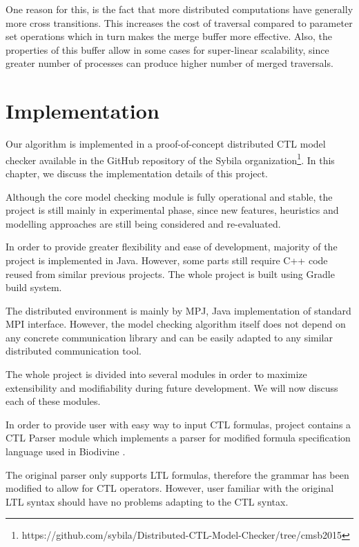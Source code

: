 \documentclass[12pt,oneside]{fithesis2}
\begin{document}
			One reason for this, is the fact that more distributed computations have generally more cross transitions. This increases the cost of traversal compared to parameter set operations which in turn makes the merge buffer more effective. Also, the properties of this buffer allow in some cases for super-linear scalability, since greater number of processes can produce higher number of merged traversals. 			
	
	\chapter{Implementation}

		Our algorithm is implemented in a proof-of-concept distributed CTL model checker available in the GitHub repository of the Sybila organization\footnote{https://github.com/sybila/Distributed-CTL-Model-Checker/tree/cmsb2015}. In this chapter, we discuss the implementation details of this project. 
		
		Although the core model checking module is fully operational and stable, the project is still mainly in experimental phase, since new features, heuristics and modelling approaches are still being considered and re-evaluated.
		
		In order to provide greater flexibility and ease of development, majority of the project is implemented in Java. However, some parts still require C++ code reused from similar previous projects. The whole project is built using Gradle build system.
			
		The distributed environment is mainly by MPJ, Java implementation of standard MPI interface. However, the model checking algorithm itself does not depend on any concrete communication library and can be easily adapted to any similar distributed communication tool.
			
		The whole project is divided into several modules in order to maximize extensibility and modifiability during future de\-vel\-op\-ment. We will now discuss each of these modules.
			
		In order to provide user with easy way to input CTL formulas, project contains a CTL Parser module which implements a parser for modified formula specification language used in Biodivine \cite{biodivine}. 
				
		The original parser only supports LTL formulas, therefore the grammar has been modified to allow for CTL operators. However, user familiar with the original LTL syntax should have no problems adapting to the CTL syntax.
				
\end{document}
